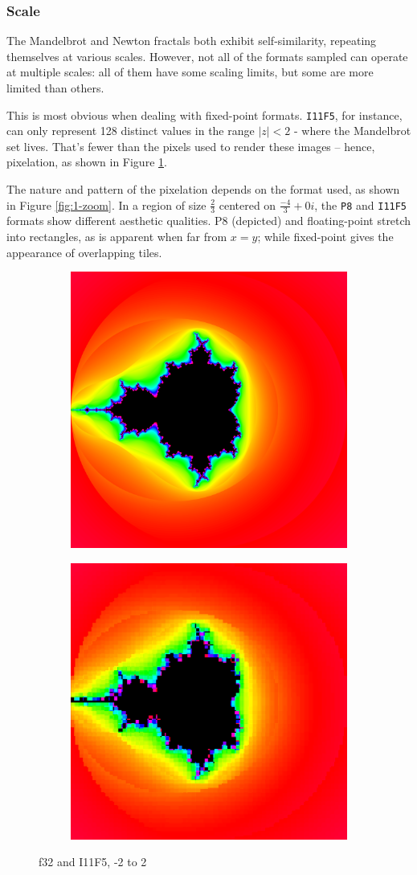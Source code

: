 \documentclass[sigconf,authorversion,nonacm]{acmart}
\begin{document}
\setcounter{subsubsection}{400390624}
\subsubsection{Scale}

The Mandelbrot and Newton fractals both exhibit self-similarity, repeating themselves at
various scales. However, not all of the formats sampled can operate at multiple scales:
all of them have some scaling limits, but some are more limited than others.

This is most obvious when dealing with fixed-point formats. \texttt{I11F5}, for instance,
can only represent 128 distinct values in the range $|z| < 2$ - where the Mandelbrot set lives.
That's fewer than the pixels used to render these images -- hence, pixelation, as shown in Figure \ref{fig:1-nozoom}.

The nature and pattern of the pixelation depends on the format used, as shown in Figure \ref{fig:1-zoom}.
In a region of size $\frac{2}{3}$ centered on $\frac{-4}{3} + 0i$, the \texttt{P8} and \texttt{I11F5}
formats show different aesthetic qualities. P8 (depicted) and floating-point stretch into rectangles,
as is apparent when far from $x=y$; while fixed-point gives the appearance of overlapping tiles.

\begin{figure}
    \begin{subfigure}[f32]
        \centering
        \includegraphics[width=0.4\linewidth]{images/1-nozoom/f32.png}
    \end{subfigure}
    \quad
    \begin{subfigure}[I11F5]
        \centering
        \includegraphics[width=0.4\linewidth]{images/1-nozoom/I11F5.png}
    \end{subfigure}
    \caption{f32 and I11F5, -2 to 2}
    \label{fig:1-nozoom}
\end{figure}
\end{document}
